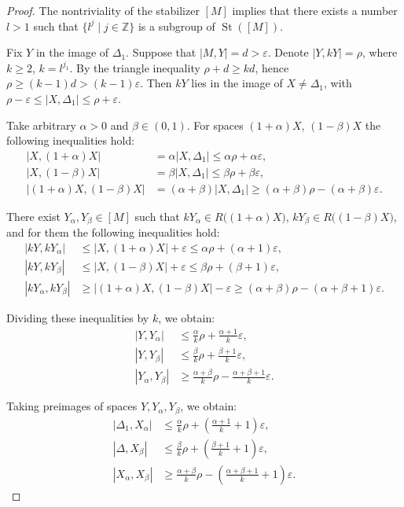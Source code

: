 \documentclass[leqno]{article}
\begin{document}
\begin{proof}
The nontriviality of the stabilizer $[M]$ implies that there exists a number $l > 1$ such that $\{l^{j} \mid j\in \mathbb{Z}\}$ is a subgroup of $\operatorname{St}([M])$.

Fix $Y$ in the image of $\Delta_{1}$. Suppose that $|M, Y| = d > \varepsilon$. Denote $|Y, kY| = \rho$, where $k \geq 2$, $k = l^{j_{1}}$. By the triangle inequality $\rho + d \geq kd$, hence $\rho \geq (k-1)d > (k-1)\varepsilon$. Then $kY$ lies in the image of $X \neq \Delta_1$, with $\rho - \varepsilon \leq |X, \Delta_1| \leq \rho + \varepsilon$.

Take arbitrary $\alpha > 0$ and $\beta \in (0,1)$. For spaces $(1+\alpha)X$, $(1-\beta)X$ the following inequalities hold:
\begin{align*}
|X, (1+\alpha)X| &= \alpha |X, \Delta_1| \leq \alpha\rho + \alpha\varepsilon, \\
|X, (1-\beta)X| &= \beta|X, \Delta_1| \leq \beta\rho + \beta\varepsilon, \\
|(1+\alpha) X, (1-\beta)X| &= (\alpha + \beta)|X, \Delta_1| \geq (\alpha+\beta)\rho - (\alpha+\beta)\varepsilon.
\end{align*}

There exist $Y_\alpha, Y_\beta \in [M]$ such that $kY_\alpha \in R\big((1+\alpha)X\big)$, $kY_\beta \in R\big((1-\beta)X\big)$, and for them the following inequalities hold:
\begin{align*}
|kY, kY_\alpha| &\leq |X, (1+\alpha)X| + \varepsilon \leq \alpha\rho + (\alpha+1)\varepsilon, \\
|kY, kY_\beta| &\leq |X, (1-\beta)X| + \varepsilon \leq \beta\rho + (\beta+1)\varepsilon, \\
|kY_\alpha, kY_\beta| &\geq |(1+\alpha)X, (1-\beta)X| - \varepsilon \geq (\alpha+\beta)\rho - (\alpha+\beta+1)\varepsilon.
\end{align*}

Dividing these inequalities by $k$, we obtain:
\begin{align*}
|Y, Y_{\alpha}| &\leq \frac{\alpha}{k}\rho + \frac{\alpha+1}{k}\varepsilon, \\
|Y, Y_{\beta}| &\leq \frac{\beta}{k}\rho + \frac{\beta+1}{k}\varepsilon, \\
|Y_\alpha, Y_{\beta}| &\geq \frac{\alpha+\beta}{k}\rho - \frac{\alpha+\beta+1}{k}\varepsilon.
\end{align*}

Taking preimages of spaces $Y, Y_{\alpha}, Y_{\beta}$, we obtain:
\begin{align*}
|\Delta_1, X_{\alpha}| &\leq \frac{\alpha}{k}\rho + \left(\frac{\alpha+1}{k} + 1\right)\varepsilon, \\
|\Delta, X_{\beta}| &\leq \frac{\beta}{k}\rho + \left(\frac{\beta+1}{k}+1\right)\varepsilon, \\
|X_\alpha, X_{\beta}| &\geq \frac{\alpha+\beta}{k}\rho - \left(\frac{\alpha+\beta+1}{k}+1\right)\varepsilon.
\end{align*}


\end{proof}
\end{document}
